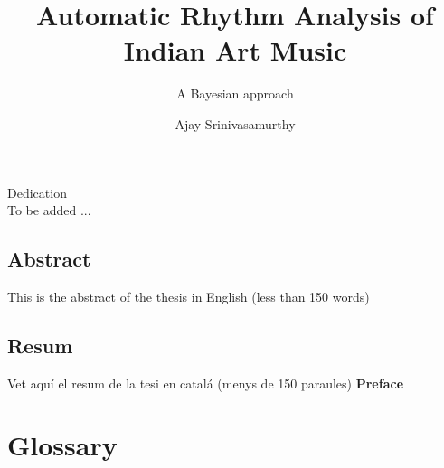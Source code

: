 \documentclass[12pt,b5paper,twoside]{UPFthesis}
\title{Automatic Rhythm Analysis of Indian Art Music}
\subtitle{A Bayesian approach}
\author{Ajay Srinivasamurthy}
\begin{document}
\pagestyle{frontmatter}
\frontmatter
\maketitle
\cleardoublepage
%
\noindent Dedication
\cleardoublepage
%
 \\
To be added ... 
\cleardoublepage
%
\section*{\Large \sffamily Abstract}
This is the abstract of the thesis in English (less than 150 words)
\vspace*{\fill}
\section*{\Large \sffamily  Resum}
\normalfont
Vet aquí el resum de la tesi en catalá (menys de 150 paraules)
\vspace*{\fill}
\cleardoublepage
%
{\bf Preface}
\cleardoublepage
%
\tableofcontents
\cleardoublepage
%

%
\listoffigures
%
\listoftables
% 
\mainmatter
\pagestyle{mainmatter}








%
%
\appendix

%
%
\chapter{Glossary}
\printglossary[type=CM]
\printglossary[type=HM]
\printglossary[type=\acronymtype]
%
\backmatter
%

%
\printindex
\end{document}
